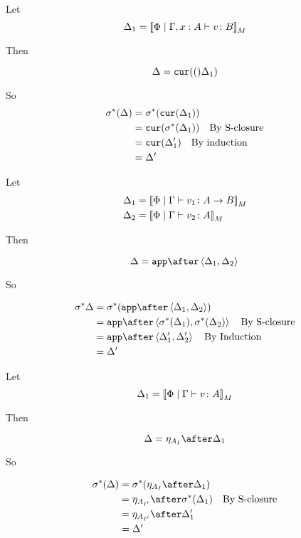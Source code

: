 \documentclass{report}
\begin{document}
Let \begin{equation}
    \Delta_1 = {\bf [\![}\Phi\mid\Gamma, x: A \vdash v \colon B{\bf ]\!]}_M
\end{equation}

Then

\begin{equation}
    \Delta = \texttt{cur}(()\Delta_1)\\
\end{equation}

So
\begin{align}
    \sigma^*(\Delta) & = \sigma^*(\texttt{cur}(\Delta_1))\\
    & = \texttt{cur}(\sigma^*(\Delta_1))\quad\text{By S-closure}\\
    & = \texttt{cur}(\Delta_1')\quad\text{By induction}\\
    & = \Delta'
\end{align}

Let \begin{align}
    \Delta_1 &= {\bf [\![}\Phi\mid\Gamma \vdash v_1 \colon A\rightarrow B{\bf ]\!]}_M\\
    \Delta_2 &= {\bf [\![}\Phi\mid\Gamma \vdash v_2 \colon A{\bf ]\!]}_M
\end{align}

Then

\begin{equation}
    \D = \app\after\pr{\D_1}{\D_2}\\
\end{equation}

So

\begin{align}
    \si\star\D & = \si\star(\app\after\pr{\D_1}{\D_2})\\
    & = \app\after\pr{\si\star(\D_1)}{\si\star(\D_2)}\qt{By S-closure}\\
    & = \app\after\pr{\D_1'}{\D_2'}\qt{By Induction}\\
    & = \D'
\end{align}

Let \begin{equation}
    \Delta_1 = {\bf [\![}\Phi\mid\Gamma \vdash v \colon A{\bf ]\!]}_M
\end{equation}

Then

\begin{equation}
    \D = \point{A_I}\after \D_1\\
\end{equation}

So

\begin{align}
    \si\star(\D) &= \si\star(\point{A_I}\after \D_1)\\
            & = \point{A_{I'}} \after\si\star(\D_1)\qt{By S-closure}\\
            & = \point{A_{I'}} \after\D_1'\\
            & = \D'
\end{align}
\end{document}
